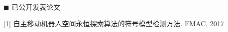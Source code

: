 \newpage
\section*{}
\vskip 0mm
{\heiti $\blacksquare$ 已公开发表论文}\vskip 5mm

[1] 自主移动机器人空间永恒探索算法的符号模型检测方法. FMAC, 2017
